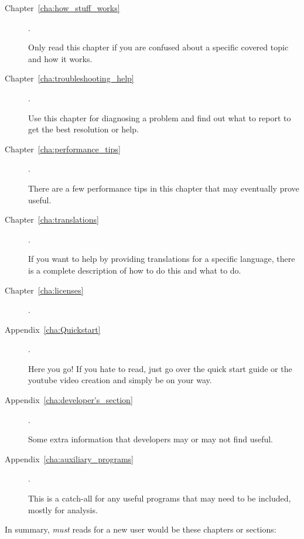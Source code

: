 \begin{description}
    \item[Chapter~\ref{cha:how_stuff_works}] .

        Only read this chapter if you are confused about a specific covered topic and how it works.

    \item[Chapter~\ref{cha:troubleshooting_help}] .

        Use this chapter for diagnosing a problem and find out what to report to get the best resolution or help.

    \item[Chapter~\ref{cha:performance_tips}]  .

        There are a few performance tips in this chapter that may eventually prove useful.

    \item[Chapter~\ref{cha:translations}] .

        If you want to help by providing translations for a specific language, there is a complete description of how to do this and what to do.

    \item[Chapter~\ref{cha:licenses}] .

    \item[Appendix~\ref{cha:Quickstart}] .

        Here you go! If you hate to read, just go over the quick start guide or the youtube video creation and simply be on your way.

    \item[Appendix~\ref{cha:developer's_section}] .

        Some extra information that developers may or may not find useful.

    \item[Appendix~\ref{cha:auxiliary_programs}] .

        This is a catch-all for any useful programs that may need to be included, mostly for analysis.

\end{description}

In summary, \textit{must} reads for a new user would be these chapters or sections:

